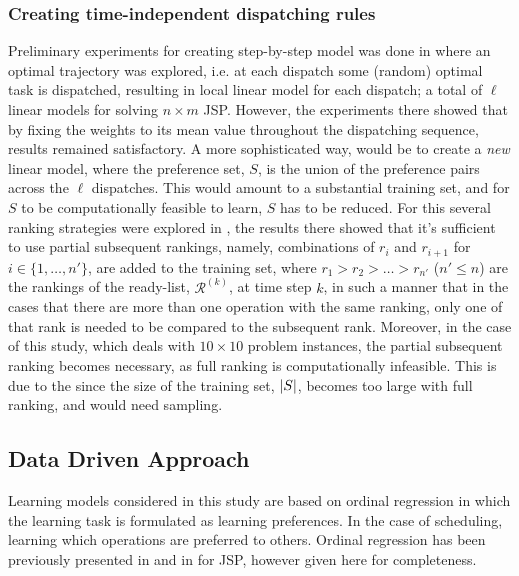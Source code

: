 \documentclass[smallextended]{svjour3}
\begin{document}
	
	
	\subsubsection{Creating time-independent dispatching rules}\label{sec:ord:timeindependent}
	
	Preliminary experiments for creating step-by-step model was done in \cite{InRu11a} where an optimal trajectory was explored, i.e. at each dispatch some (random) optimal task is dispatched, resulting in local linear model for each dispatch; a total of $\ell$ linear models for solving $n\times m$ JSP. However, the experiments there showed that by fixing the weights to its mean value throughout the dispatching sequence, results remained satisfactory.  
	A more sophisticated way, would be to create a \emph{new} linear model, where the preference set, $S$, is the union of the preference pairs across the $\ell$ dispatches. This would amount to a substantial training set, and for $S$ to be computationally feasible to learn, $S$ has to be reduced. For this several ranking strategies were explored in \cite{InRu14b}, the results there showed that it's sufficient to use partial subsequent rankings, namely, combinations of $r_i$ and $r_{i+1}$ for $i\in\{1,\ldots,n'\}$, are added to the training set, where $r_1>r_2>\ldots>r_{n'}$ ($n'\leq n$) are the rankings of the ready-list, $\mathcal{R}^{(k)}$, at time step $k$, in such a manner that in the cases that there are more than one operation with the same ranking, only one of that rank is needed to be compared to the subsequent rank. Moreover, in the case of this study, which deals with $10\times 10$ problem instances, the partial subsequent ranking becomes necessary, as full ranking is computationally infeasible. This is due to the since the size of the training set, $\lvert S\rvert$, becomes too large with full ranking, and would need sampling.
	
	
	\subsection{Data Driven Approach}
	
	Learning models considered in this study are based on ordinal regression in which the learning task is formulated as learning preferences. In the case of scheduling, learning which operations are preferred to others. Ordinal regression has been previously presented in \cite{Ru06:PPSN} and in \cite{InRu11a} for JSP, however given here for completeness. 
	
\end{document}
